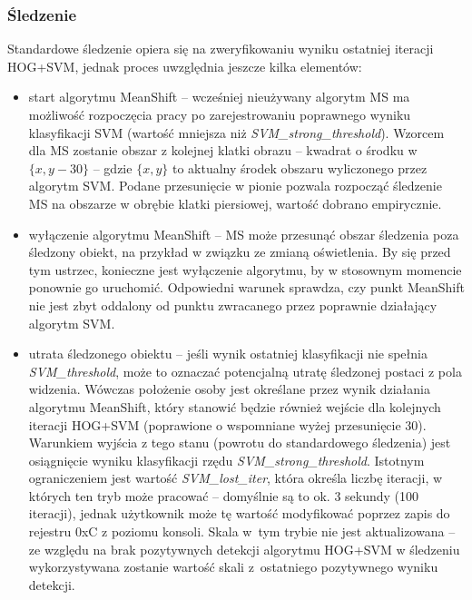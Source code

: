 \subsubsection{Śledzenie}
Standardowe śledzenie opiera się na zweryfikowaniu wyniku ostatniej iteracji HOG+SVM, jednak proces uwzględnia jeszcze kilka elementów:
\begin{itemize}
	\item start algorytmu MeanShift -- wcześniej nieużywany algorytm MS ma możliwość rozpoczęcia pracy po zarejestrowaniu poprawnego wyniku klasyfikacji SVM (wartość mniejsza niż \textit{SVM\_strong\_threshold}). %
	Wzorcem dla MS zostanie obszar z kolejnej klatki obrazu -- kwadrat o środku w $\{x,y-30\}$ -- gdzie $\{x,y\}$ to aktualny środek obszaru wyliczonego przez algorytm SVM. 
	Podane przesunięcie w pionie pozwala rozpocząć śledzenie MS na obszarze w obrębie klatki piersiowej, wartość dobrano empirycznie.
	
	\item wyłączenie algorytmu MeanShift -- MS może przesunąć obszar śledzenia poza śledzony obiekt, na przykład w związku ze zmianą oświetlenia. 
	By się przed tym ustrzec, konieczne jest wyłączenie algorytmu, by w stosownym momencie ponownie go uruchomić. 
	Odpowiedni warunek sprawdza, czy punkt MeanShift nie jest zbyt oddalony od punktu zwracanego przez poprawnie działający algorytm SVM.
	
	\item utrata śledzonego obiektu -- jeśli wynik ostatniej klasyfikacji nie spełnia \textit{SVM\_threshold}, może to oznaczać potencjalną utratę śledzonej postaci z pola widzenia. 
	Wówczas położenie osoby jest określane przez wynik działania algorytmu MeanShift, który stanowić będzie również wejście dla kolejnych iteracji HOG+SVM (poprawione o wspomniane wyżej przesunięcie $30$). 
	Warunkiem wyjścia z tego stanu (powrotu do standardowego śledzenia) jest osiągnięcie wyniku klasyfikacji rzędu \textit{SVM\_strong\_threshold}.
	Istotnym ograniczeniem jest wartość \textit{SVM\_lost\_iter}, która określa liczbę iteracji, w których ten tryb może pracować -- domyślnie są to ok. 3 sekundy (100 iteracji), jednak użytkownik może tę wartość modyfikować poprzez zapis do rejestru 0xC z poziomu konsoli. 
	Skala w~tym trybie nie jest aktualizowana -- ze względu na brak pozytywnych detekcji algorytmu HOG+SVM w śledzeniu wykorzystywana zostanie wartość skali z~ostatniego pozytywnego wyniku detekcji. %
\end{itemize} 



